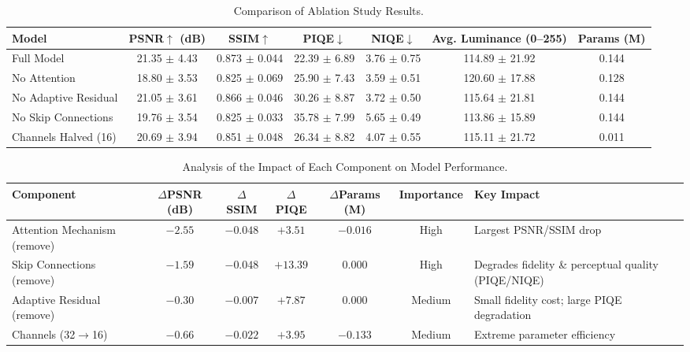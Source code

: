 \documentclass[sensors,article,submit,moreauthors]{Definitions/mdpi}
\begin{document}
\begin{table}[H]
\caption{Comparison of Ablation Study Results.\label{tab5}}
\begin{tabularx}{\textwidth}{LCCCCCC}
\toprule
\textbf{Model}	& \textbf{PSNR$\uparrow$ (dB)}	& \textbf{SSIM$\uparrow$}	& \textbf{PIQE$\downarrow$}	& \textbf{NIQE$\downarrow$}	& \textbf{Avg. Luminance (0--255)}	& \textbf{Params (M)}\\
\midrule
Full Model	& 21.35 $\pm$ 4.43	& 0.873 $\pm$ 0.044	& 22.39 $\pm$ 6.89	& 3.76 $\pm$ 0.75	& 114.89 $\pm$ 21.92	& 0.144\\
No Attention	& 18.80 $\pm$ 3.53	& 0.825 $\pm$ 0.069	& 25.90 $\pm$ 7.43	& 3.59 $\pm$ 0.51	& 120.60 $\pm$ 17.88	& 0.128\\
No Adaptive Residual	& 21.05 $\pm$ 3.61	& 0.866 $\pm$ 0.046	& 30.26 $\pm$ 8.87	& 3.72 $\pm$ 0.50	& 115.64 $\pm$ 21.81	& 0.144\\
No Skip Connections	& 19.76 $\pm$ 3.54	& 0.825 $\pm$ 0.033	& 35.78 $\pm$ 7.99	& 5.65 $\pm$ 0.49	& 113.86 $\pm$ 15.89	& 0.144\\
Channels Halved (16)	& 20.69 $\pm$ 3.94	& 0.851 $\pm$ 0.048	& 26.34 $\pm$ 8.82	& 4.07 $\pm$ 0.55	& 115.11 $\pm$ 21.72	& 0.011\\
\bottomrule
\end{tabularx}
\end{table}

\begin{table}[H]
\caption{Analysis of the Impact of Each Component on Model Performance.\label{tab6}}
\begin{tabularx}{\textwidth}{LCCCCCL}
\toprule
\textbf{Component}	& \textbf{$\Delta$PSNR (dB)}	& \textbf{$\Delta$SSIM}	& \textbf{$\Delta$PIQE}	& \textbf{$\Delta$Params (M)}	& \textbf{Importance}	& \textbf{Key Impact}\\
\midrule
Attention Mechanism (remove)	& $-2.55$	& $-0.048$	& $+3.51$	& $-0.016$	& High	& Largest PSNR/SSIM drop\\
Skip Connections (remove)	& $-1.59$	& $-0.048$	& $+13.39$	& $0.000$	& High	& Degrades fidelity \& perceptual quality (PIQE/NIQE)\\
Adaptive Residual (remove)	& $-0.30$	& $-0.007$	& $+7.87$	& $0.000$	& Medium	& Small fidelity cost; large PIQE degradation\\
Channels (32$\rightarrow$16)	& $-0.66$	& $-0.022$	& $+3.95$	& $-0.133$	& Medium	& Extreme parameter efficiency\\
\bottomrule
\end{tabularx}
\end{table}
\end{document}
